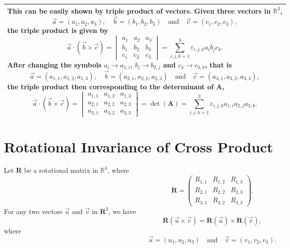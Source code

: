 \documentclass[12pt]{article}
\renewenvironment{quote}
    {\begin{center}
    \begin{tabular}{|p{0.9\textwidth}|}
    \hline
    }
    { 
    \\\hline
    \end{tabular} 
    \end{center}
    }
\begin{document}
\begin{quote}
This can be easily shown by triple product of vectors. Given three vectors in $\mathbb{R}^3$, 
\begin{equation}
\vec{a} = (a_1, a_2, a_3),\quad
\vec{b} = (b_1, b_2, b_3)\quad\text{and}\quad
\vec{c} = (c_1, c_2, c_3),
\end{equation}
the triple product is given by
\begin{equation}
\vec{a}\cdot \left(\vec{b}\times\vec{c}\right) 
=\begin{vmatrix}
a_1 & a_2 & a_3 \\
b_1 & b_2 & b_3 \\
c_1 & c_2 & c_3
\end{vmatrix}
= \sum_{i,j,k=1}^{3} \varepsilon_{i,j,k} a_{i} b_{j} c_{k}.
\end{equation}
After changing the symbols $a_{i}\to a_{1,i}$, $b_{j}\to b_{2,j}$ and $c_{k}\to c_{3,k}$, that is 
\begin{equation}
\vec{a} = (a_{1,1}, a_{1,2}, a_{1,3}),\quad
\vec{b} = (a_{2,1}, a_{2,2}, a_{2,3})\quad\text{and}\quad
\vec{c} = (a_{3,1}, a_{3,2}, a_{3,3}),
\end{equation}
the triple product then corresponding to the determinant of $\mathbf{A}$, 
\begin{equation}
\vec{a}\cdot \left(\vec{b}\times\vec{c}\right) 
=\begin{vmatrix}
a_{1,1} & a_{1,2} & a_{1,3}\\
a_{2,1} & a_{2,2} & a_{2,3}\\
a_{3,1} & a_{3,2} & a_{3,3}
\end{vmatrix}
= \det(\mathbf{A})
= \sum_{i,j,k=1}^{3} \varepsilon_{i,j,k} a_{1,i}a_{2,j}a_{3,k}.
\end{equation}

\end{quote}

\newpage
\section{Rotational Invariance of Cross Product}
Let $\mathbf{R}$ be a rotational matrix in $\mathbb{R}^3$, where 
\begin{equation}
\mathbf{R} = 
\begin{pmatrix}
R_{1,1} & R_{1,2} & R_{1,3}\\
R_{2,1} & R_{2,2} & R_{2,3}\\
R_{3,1} & R_{3,2} & R_{3,3}
\end{pmatrix}.
\end{equation}
For any two vectors $\vec{u}$ and $\vec{v}$ in $\mathbf{R}^3$, we have 
\begin{equation}
\mathbf{R}\left(\vec{u}\times\vec{v}\right) = \mathbf{R}\left(\vec{u}\right) \times \mathbf{R}\left(\vec{v}\right),
\end{equation}
where 
\begin{equation}
\vec{u} = (u_1, u_2, u_3) \quad\text{and}\quad \vec{v} = (v_1, v_2, v_3).
\end{equation}
\end{document}
